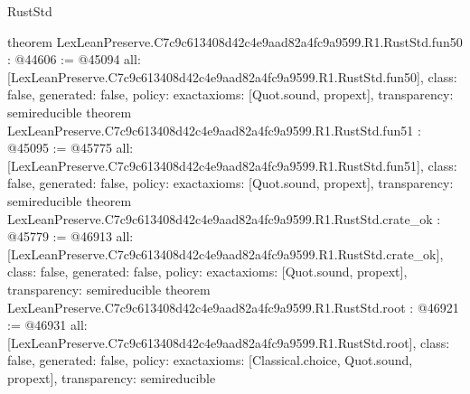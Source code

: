 \begin{lexlean}{RustStd}
\begin{coremodule}
{}
theorem LexLeanPreserve.C7c9c613408d42c4e9aad82a4fc9a9599.R1.RustStd.fun50 : @44606 := @45094 {
  all: [LexLeanPreserve.C7c9c613408d42c4e9aad82a4fc9a9599.R1.RustStd.fun50],
  class: false,
  generated: false,
  policy: exact{axioms: [Quot.sound, propext]},
  transparency: semireducible
}
theorem LexLeanPreserve.C7c9c613408d42c4e9aad82a4fc9a9599.R1.RustStd.fun51 : @45095 := @45775 {
  all: [LexLeanPreserve.C7c9c613408d42c4e9aad82a4fc9a9599.R1.RustStd.fun51],
  class: false,
  generated: false,
  policy: exact{axioms: [Quot.sound, propext]},
  transparency: semireducible
}
theorem LexLeanPreserve.C7c9c613408d42c4e9aad82a4fc9a9599.R1.RustStd.crate_ok : @45779 := @46913 {
  all: [LexLeanPreserve.C7c9c613408d42c4e9aad82a4fc9a9599.R1.RustStd.crate_ok],
  class: false,
  generated: false,
  policy: exact{axioms: [Quot.sound, propext]},
  transparency: semireducible
}
theorem LexLeanPreserve.C7c9c613408d42c4e9aad82a4fc9a9599.R1.RustStd.root : @46921 := @46931 {
  all: [LexLeanPreserve.C7c9c613408d42c4e9aad82a4fc9a9599.R1.RustStd.root],
  class: false,
  generated: false,
  policy: exact{axioms: [Classical.choice, Quot.sound, propext]},
  transparency: semireducible
}


\end{coremodule}
\end{lexlean}
